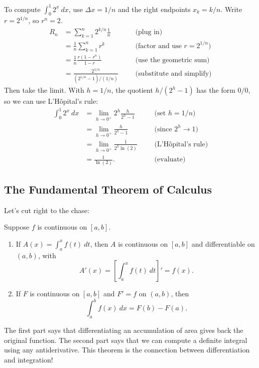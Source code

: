 \begin{exampleblock}
    To compute $\int_0^1 2^x\ dx$, use $\Delta x=1/n$ and the right endpoints $x_k=k/n$. Write $r=2^{1/n}$, so $r^n=2$.
    \begin{align*}
        R_n
        & = \sum_{k=1}^n 2^{k/n}\frac{1}{n} &&& \text{(plug in)}\\
        & = \frac{1}{n}\sum_{k=1}^n r^k &&& \text{(factor and use $r=2^{1/n}$)}\\
        & = \frac{1}{n}\frac{r(1-r^n)}{1-r} &&& \text{(use the geometric sum)}\\
        & = \frac{2^{1/n}}{(2^{1/n}-1)/(1/n)} &&& \text{(substitute and simplify)}
    \end{align*}
    Then take the limit. With $h=1/n$, the quotient $h/(2^h-1)$ has the form $0/0$, so we can use L'H\^opital's rule:
    \begin{align*}
        \int_0^1 2^x\ dx
        & = \lim_{h\to0^+} 2^h\frac{h}{2^h-1} &&& \text{(set $h=1/n$)}\\
        & = \lim_{h\to0^+}\frac{h}{2^h-1} &&& \text{(since $2^h\to 1$)}\\
        & = \lim_{h\to0^+}\frac{1}{2^h\ln(2)} &&& \text{(L'H\^opital's rule)}\\
        & = \frac{1}{\ln(2)}. &&& \text{(evaluate)}
    \end{align*}
\end{exampleblock}

\subsection{The Fundamental Theorem of Calculus}

Let's cut right to the chase:

\begin{thm}
    Suppose $f$ is continuous on $[a,b]$.
    \begin{enumerate}
        \item If $A(x)=\int_a^x f(t)\ dt$, then $A$ is continuous on $[a,b]$ and differentiable on $(a,b)$, with
        $$A'(x)=\left[\int_a^x f(t)\ dt\right]'=f(x).$$
        \item If $F$ is continuous on $[a,b]$ and $F'=f$ on $(a,b)$, then
        $$\int_a^b f(x)\ dx=F(b)-F(a).$$
    \end{enumerate}
\end{thm}

The first part says that differentiating an accumulation of area gives back the original function. The second part says that we can compute a definite integral using any antiderivative. This theorem is the connection between differentiation and integration!

